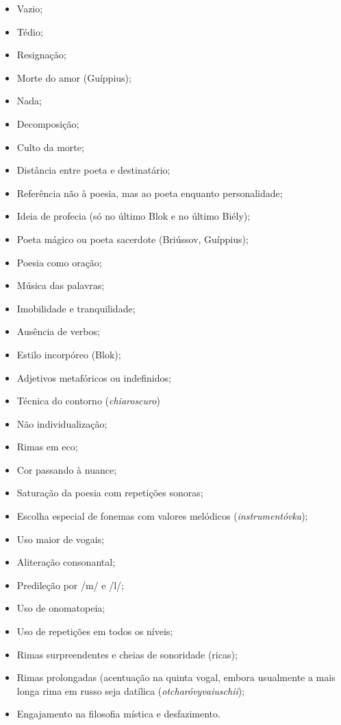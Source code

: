 \begin{itemize}
\item
  Vazio;
\item
  Tédio;
\item
  Resignação;
\item
  Morte do amor (Guíppius);
\item
  Nada;
\item
  Decomposição;
\item
  Culto da morte;
\item
  Distância entre poeta e destinatário;
\item
  Referência não à poesia, mas ao poeta enquanto personalidade;
\item
  Ideia de profecia (só no último Blok e no último Biély);
\item
  Poeta mágico ou poeta sacerdote (Briússov, Guíppius);
\item
  Poesia como oração;
\item
  Música das palavras;
\item
  Imobilidade e tranquilidade;
\item
  Ausência de verbos;
\item
  Estilo incorpóreo (Blok);
\item
  Adjetivos metafóricos ou indefinidos;
\item
  Técnica do contorno (\emph{chiaroscuro})
\item
  Não individualização;
\item
  Rimas em eco;
\item
  Cor passando à nuance;
\item
  Saturação da poesia com repetições sonoras;
\item
  Escolha especial de fonemas com valores melódicos
  (\emph{instrumentóvka});
\item
  Uso maior de vogais;
\item
  Aliteração consonantal;
\item
  Predileção por /m/ e /l/;
\item
  Uso de onomatopeia;
\item
  Uso de repetições em todos os níveis;
\item
  Rimas surpreendentes e cheias de sonoridade (ricas);
\item
  Rimas prolongadas (acentuação na quinta vogal, embora usualmente a
  mais longa rima em russo seja datílica (\emph{otcharóvyvaiuschii});
\item
  Engajamento na filosofia mística e desfazimento.
\end{itemize}

